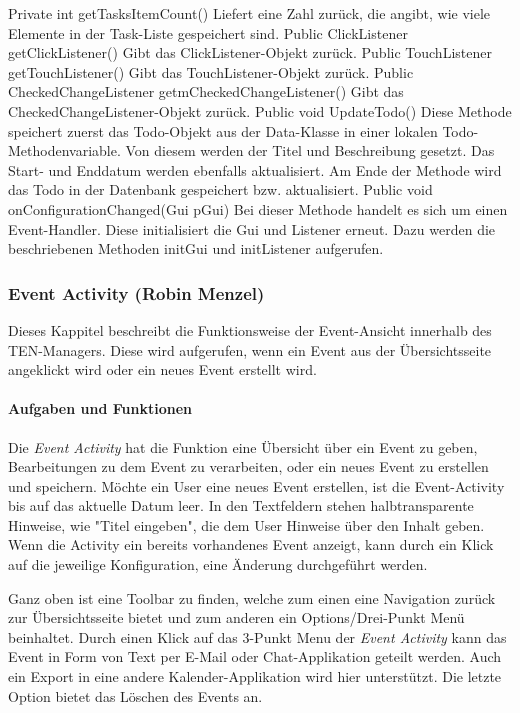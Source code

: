 Private int getTasksItemCount()
Liefert eine Zahl zurück, die angibt, wie viele Elemente in der Task-Liste gespeichert sind.
Public ClickListener getClickListener()
Gibt das ClickListener-Objekt zurück.
Public TouchListener getTouchListener()
	Gibt das TouchListener-Objekt zurück.
Public CheckedChangeListener getmCheckedChangeListener()
	Gibt das CheckedChangeListener-Objekt zurück.
Public void UpdateTodo()
Diese Methode speichert zuerst das Todo-Objekt aus der Data-Klasse in einer lokalen Todo-Methodenvariable. Von diesem werden der Titel und Beschreibung gesetzt. Das Start- und Enddatum werden ebenfalls aktualisiert. Am Ende der Methode wird das Todo in der Datenbank gespeichert bzw. aktualisiert.
Public void onConfigurationChanged(Gui pGui)
Bei dieser Methode handelt es sich um einen Event-Handler. Diese initialisiert die Gui und Listener erneut. Dazu werden die beschriebenen Methoden initGui und initListener aufgerufen.

\newpage
\subsubsection{Event Activity (Robin Menzel)}
Dieses Kappitel beschreibt die Funktionsweise der Event-Ansicht innerhalb des TEN-Managers. Diese wird aufgerufen, wenn ein Event aus der Übersichtsseite angeklickt wird oder ein neues Event erstellt wird.

\paragraph{Aufgaben und Funktionen}

Die \textit{Event Activity} hat die Funktion eine Übersicht über ein Event zu geben, Bearbeitungen zu dem Event zu verarbeiten, oder ein neues Event zu erstellen und speichern. Möchte ein User eine neues Event erstellen, ist die Event-Activity bis auf das aktuelle Datum leer. In den Textfeldern stehen halbtransparente Hinweise, wie "Titel eingeben", die dem User Hinweise über den Inhalt geben. Wenn die Activity ein bereits vorhandenes Event anzeigt, kann durch ein Klick auf die jeweilige Konfiguration, eine Änderung durchgeführt werden.

Ganz oben ist eine Toolbar zu finden, welche zum einen eine Navigation zurück zur Übersichtsseite bietet und zum anderen ein Options/Drei-Punkt Menü beinhaltet. Durch einen Klick auf das 3-Punkt Menu der \textit{Event Activity}  kann das Event in Form von Text per E-Mail oder Chat-Applikation geteilt werden. Auch ein Export in eine andere Kalender-Applikation wird hier unterstützt. Die letzte Option bietet das Löschen des Events an.

